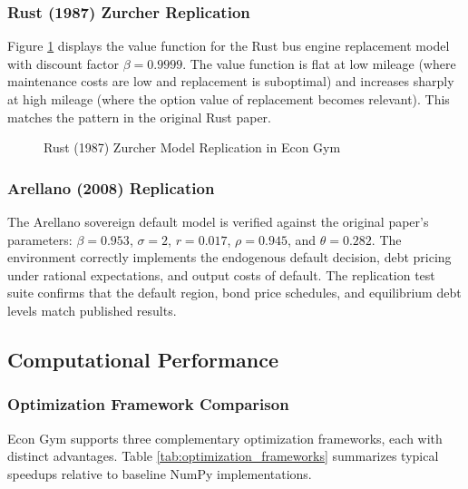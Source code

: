 \documentclass[12pt]{article}
\begin{document}
\subsubsection{Rust (1987) Zurcher Replication}

Figure \ref{fig:zurcher} displays the value function for the Rust bus engine replacement model with discount factor $\beta = 0.9999$. The value function is flat at low mileage (where maintenance costs are low and replacement is suboptimal) and increases sharply at high mileage (where the option value of replacement becomes relevant). This matches the pattern in the original Rust paper.

\begin{figure}[H]
\centering
{}
\caption{Rust (1987) Zurcher Model Replication in Econ Gym}
\label{fig:zurcher}
\end{figure}

\subsubsection{Arellano (2008) Replication}

The Arellano sovereign default model is verified against the original paper's parameters: $\beta = 0.953$, $\sigma = 2$, $r = 0.017$, $\rho = 0.945$, and $\theta = 0.282$. The environment correctly implements the endogenous default decision, debt pricing under rational expectations, and output costs of default. The replication test suite confirms that the default region, bond price schedules, and equilibrium debt levels match published results.

\subsection{Computational Performance}

\subsubsection{Optimization Framework Comparison}

Econ Gym supports three complementary optimization frameworks, each with distinct advantages. Table \ref{tab:optimization_frameworks} summarizes typical speedups relative to baseline NumPy implementations.
\end{document}
